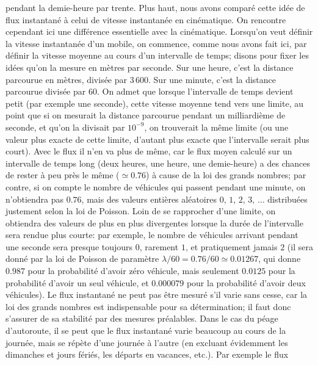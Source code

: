 pendant la demie-heure par trente.  Plus haut, nous avons compar\'e
cette id\'ee de flux instantan\'e \`a celui de vitesse instantan\'ee
en cin\'ematique.  On rencontre cependant ici une diff\'erence
essentielle avec la cin\'ematique.  
\medskip
Lorsqu'on veut d\'efinir la vitesse instantan\'ee d'un mobile, 
on commence,  comme nous avons fait ici,  par d\'efinir la vitesse
moyenne au cours d'un intervalle de temps;  disons pour fixer les
id\'ees qu'on la mesure en m\`etres par seconde.  Sur une heure, 
c'est la distance parcourue en m\`etres, divis\'ee par $3\, 600$. 
Sur une minute,  c'est la distance parcourue divis\'ee par $60$. 
On admet que lorsque l'intervalle de temps devient petit (par exemple
une seconde),  cette vitesse moyenne tend vers une limite,  au point
que si on mesurait la distance parcourue pendant un milliardi\`eme
de seconde,  et qu'on la divisait par $10^{-9}$,  on trouverait la
m\^eme limite (ou une valeur plus exacte de cette limite, d'autant
plus exacte que l'intervalle serait plus court).  Avec le flux il n'en
va plus de m\^eme, car le flux moyen calcul\'e sur un intervalle de
temps long (deux heures, une heure, une demie-heure)  a des chances de
rester \`a peu pr\`es le m\^eme ($\simeq 0.76$) \`a cause de la loi
des grands nombres;  par contre,  si on compte le nombre de v\'ehicules
qui passent pendant une minute,  on n'obtiendra pas $0.76$,  mais des
valeurs enti\`eres al\'eatoires $0,\, 1,\, 2,\, 3,\, \ldots$ distribu\'ees
justement  selon la loi de Poisson.  Loin de se rapprocher d'une limite, 
on obtiendra des valeurs de plus en plus divergentes lorsque la dur\'ee
de l'intervalle sera rendue plus courte:  par exemple,  le nombre de
v\'ehicules arrivant pendant une seconde sera presque toujours $0$, 
rarement $1$,  et pratiquement jamais $2$ (il sera donn\'e par la loi
de Poisson de param\`etre $\lambda/60 = 0.76 / 60 \simeq 0.01267$, 
qui donne $0.987$ pour la probabilit\'e d'avoir z\'ero v\'ehicule, 
mais seulement $0.0125$ pour la probabilit\'e d'avoir un seul v\'ehicule, 
et $0.000079$ pour la probabilit\'e d'avoir deux v\'ehicules).      
\medskip 
Le flux instantan\'e ne peut pas \^etre mesur\'e s'il varie sans  
cesse, car la loi des grands nombres est indispensable pour sa 
d\'etermination; il faut donc s'assurer de sa stabilit\'e par des mesures 
pr\'ealables. Dans le cas du p\'eage d'autoroute, il se peut que le flux 
instantan\'e varie beaucoup au cours de la journ\'ee, mais se r\'ep\`ete 
d'une journ\'ee \`a l'autre (en excluant \'evidemment les dimanches et 
jours f\'eri\'es, les d\'eparts en vacances, etc.). Par exemple le flux 
